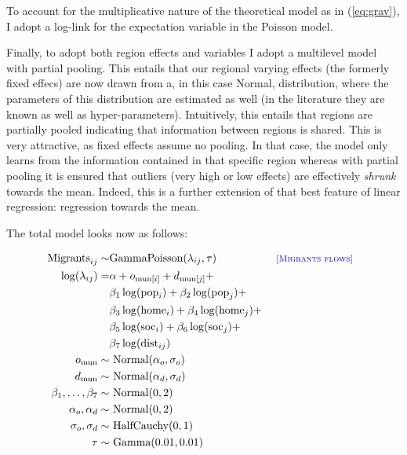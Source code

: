 \documentclass[12pt, parskip, abstracton,notitlepage]{scrartcl}
\begin{document}
To account for the multiplicative nature of the theoretical
model as in (\ref{eq:grav}), I adopt a log-link for the
expectation variable in the Poisson model.

Finally, to adopt both region effects and variables I adopt a
multilevel model with partial pooling. This entails that our
regional varying effects (the formerly fixed effecs) are now
drawn from a, in this case Normal, distribution, where the
parameters of this distribution are estimated as well (in the
literature they are known as well as
hyper-parameters). Intuitively, this entails that regions are
partially pooled indicating that information between regions
is shared. This is very attractive, as fixed effects assume no
pooling. In that case, the model only learns from the information contained
in that specific region whereas with partial pooling it is ensured that
outliers (very high or low effects) are effectively
\emph{shrunk} towards the mean. Indeed, this is a further
extension of that best feature of linear regression:
regression towards the mean.

The total model looks now as follows:

\begin{subequations}
	\begin{align} \text{Migrants}_{ij} \sim & \text{GammaPoisson}(\lambda_{ij}, \tau) & \text{\textsc{\footnotesize { {\color{blue} [Migrants flows] } }}} \label{outcome} \\
	\log(\lambda_{ij}) =
	& \alpha + o_{\text{mun}[i]} + d_{\text{mun}[j]} + \notag
	\\ & \beta_1 \log(\text{pop}_i) +
	\beta_2\log(\text{pop}_j) + \notag \\ & \beta_3
	\log(\text{home}_i) + \beta_4 \log(\text{home}_j) + \notag\\
	& \beta_5 \log(\text{soc}_i) + \beta_6 \log(\text{soc}_j)
	+ \notag \\ & \beta_7 \log(\text{dist}_{ij}) \label{linear} \\
	o_{\text{mun}} \sim& \text{ Normal}(\alpha_o, \sigma_o) \label{muno} \\
	d_{\text{mun}} \sim& \text{ Normal}(\alpha_d, \sigma_d) \label{mund} \\
	\beta_1,\ldots, \beta_7 \sim& \text{
		Normal}(0,2)\\ \alpha_o, \alpha_d \sim& \text{ Normal}(0,2)\\
	\sigma_o, \sigma_d \sim& \text{ HalfCauchy}(0,1) \\ \tau
	\sim& \text{ Gamma}(0.01, 0.01)
	\end{align}
	\label{model}
\end{subequations}
\end{document}
